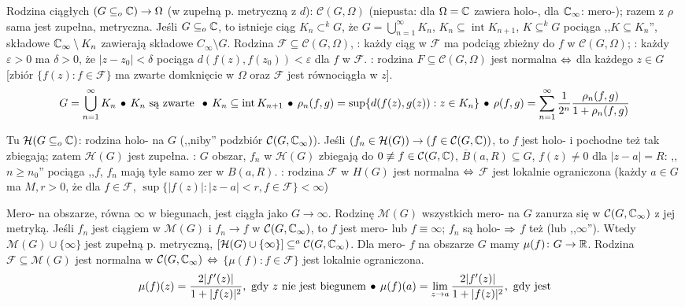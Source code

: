 Rodzina  ciągłych $(G \subseteq_o \mathbb{C}) \to \Omega$ (w zupełną p. metryczną z $d$): $\mathcal C(G, \Omega)$ (niepusta: dla $\Omega =\mathbb{C}$ zawiera holo-, dla $\mathbb{C}_\infty$: mero-); razem z $\rho$ sama jest zupełna, metryczna.
Jeśli $G \subseteq_o \mathbb{C}$, to istnieje ciąg $K_n \subset^k G$, że $G = \bigcup_{n=1}^\infty K_n$, $K_n \subseteq \operatorname{int} K_{n+1}$, $K\subseteq^k G$ pociąga ,,$K\subseteq K_n$'', składowe $\mathbb{C}_\infty \setminus K_n$ zawierają składowe $C_\infty \setminus G$.
Rodzina $\mathcal F \subseteq \mathcal C(G, \Omega)$, : każdy ciąg w $\mathcal F$ ma podciąg zbieżny do $f$ w $\mathcal C(G, \Omega)$; : każdy $\varepsilon > 0$ ma $\delta > 0$, że $|z - z_0| < \delta$ pociąga $d(f(z), f(z_0)) < \varepsilon$ dla $f$ w $\mathcal F$.
: rodzina $F \subseteq \mathcal C(G, \Omega)$ jest normalna $\Leftrightarrow$ dla każdego $z \in G$ [zbiór $\{f(z) : f \in \mathcal F\}$ ma zwarte domknięcie w $\Omega$ oraz $\mathcal F$ jest równociągła w $z$].
\[
	G = \bigcup_{n=1}^\infty K_n \, \bullet \,
	K_n \text { są zwarte } \, \bullet \,
	K_n \subseteq \operatorname{int} K_{n+1} \, \bullet \,
	\rho_n(f,g) = \sup\{d(f(z), g(z)) : z \in K_n\} \, \bullet \,
	\rho(f, g) = \sum_{n=1}^\infty \frac{1}{2^n} \frac{\rho_n(f,g)}{1+\rho_n(f,g)}
\]

Tu  $\mathcal H(G \subseteq_o \mathbb{C})$: rodzina holo- na $G$ (,,niby'' podzbiór $\mathcal C(G, \mathbb{C}_\infty)$).
Jeśli $(f_n \in \mathcal H(G)) \to (f \in \mathcal C(G, \mathbb{C}))$, to $f$ jest holo- i pochodne też tak zbiegają; zatem $\mathcal H(G)$ jest zupełna.
: $G$ obszar, $f_n$ w $\mathcal H(G)$ zbiegają do $0 \not\equiv f \in \mathcal C(G, \mathbb{C})$, $\overline{B}(a, R) \subseteq G$, $f(z) \neq 0$ dla $|z-a| = R$: ,,$n \ge n_0$'' pociąga ,,$f$, $f_n$ mają tyle samo zer w $B(a,R)$.
: rodzina $\mathcal F$ w $H(G)$ jest normalna $\Leftrightarrow$ $\mathcal F$ jest lokalnie ograniczona (każdy $a \in G$ ma $M, r > 0$, że dla $f \in \mathcal F$, $\sup\{|f(z)| : |z-a| < r, f \in \mathcal F\} < \infty$)

Mero-  na obszarze, równa $\infty$ w biegunach, jest ciągła jako $G \to \infty$.
Rodzinę $\mathcal M(G)$ wszystkich mero- na $G$ zanurza się w $\mathcal C(G, \mathbb{C}_\infty)$ z jej metryką.
Jeśli $f_n$ jest ciągiem w $\mathcal M(G)$ i $f_n \to f$ w $\mathcal C(G, \mathbb{C}_\infty)$, to $f$ jest mero- lub $f \equiv \infty$; $f_n$ są holo- $\Rightarrow$ $f$ też (lub ,,$\infty$'').
Wtedy $\mathcal M(G) \cup \{\infty\}$ jest zupełną p. metryczną, $[\mathcal H(G) \cup \{\infty\}] \subseteq^a \mathcal C(G, \mathbb{C}_\infty)$.
Dla mero- $f$ na obszarze $G$ mamy $\mu(f) \colon G \to \mathbb{R}$.
Rodzina $\mathcal F \subseteq \mathcal M(G)$ jest normalna w $\mathcal C(G, \mathbb{C}_\infty)$ $\Leftrightarrow$ $\{\mu(f) : f \in \mathcal F \}$ jest lokalnie ograniczona.
\[
	\mu(f)(z) = \frac{2|f'(z)|}{1+|f(z)|^2}, \text { gdy } z \text{ nie jest biegunem} \, \bullet \,
	\mu(f)(a) = \lim_{z\to a}\frac{2|f'(z)|}{1+|f(z)|^2}, \text { gdy jest}
\]

